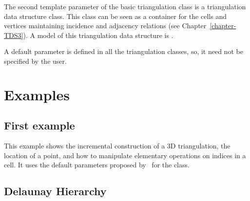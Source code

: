 The second template parameter of the basic triangulation class
 is a triangulation 
data structure class.  This class can be seen as a container for the
cells and vertices maintaining incidence and adjacency relations (see
Chapter~\ref{chapter-TDS3}).  A model of this triangulation data
structure is .

A default parameter is defined in all the triangulation classes, so, it 
need not be specified by the user. 

\section{Examples}
\label{Triangulation3-sec-examples}
\subsection{First example}
This example shows the incremental construction of a 3D triangulation, 
the location of a point, and how to manipulate elementary operations
on indices in a cell. It uses the default parameters proposed by
\cgal\ for the  class.


\subsection{Delaunay Hierarchy}

